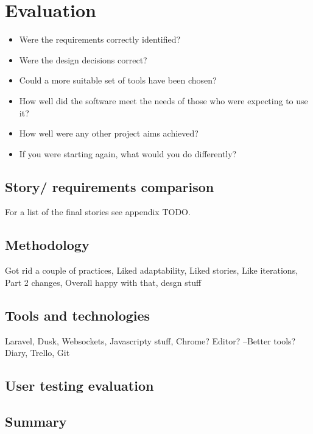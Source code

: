 \chapter{Evaluation}
\begin{itemize}
   \item Were the requirements correctly identified? 
   \item Were the design decisions correct?
   \item Could a more suitable set of tools have been chosen?
   \item How well did the software meet the needs of those who were expecting to use it?
   \item How well were any other project aims achieved?
   \item If you were starting again, what would you do differently?
\end{itemize}
\section{Story/ requirements comparison}
For a list of the final stories see appendix TODO.
\section{Methodology}
Got rid a couple of practices,
Liked adaptability,
Liked stories,
Like iterations,
Part 2 changes,
Overall happy with that,
desgn stuff
\section{Tools and technologies}
Laravel, Dusk, Websockets, Javascripty stuff, Chrome? Editor? --Better tools? Diary, Trello, Git
\section{User testing evaluation}
\section{Summary}